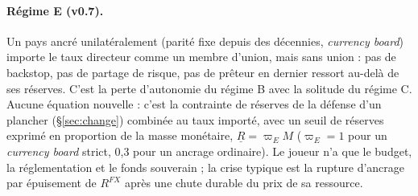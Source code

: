 \documentclass[11pt,a4paper]{article}
\begin{document}
\paragraph{Régime E (v0.7).} Un pays ancré unilatéralement (parité fixe depuis des décennies, \emph{currency board}) importe le taux directeur comme un membre d'union, mais sans union : pas de backstop, pas de partage de risque, pas de prêteur en dernier ressort au-delà de ses réserves. C'est la perte d'autonomie du régime B avec la solitude du régime C. Aucune équation nouvelle : c'est la contrainte de réserves de la défense d'un plancher (\S\ref{sec:change}) combinée au taux importé, avec un seuil de réserves exprimé en proportion de la masse monétaire, $\underline R=\varpi_E M$ ($\varpi_E=1$ pour un \emph{currency board} strict, 0,3 pour un ancrage ordinaire). Le joueur n'a que le budget, la réglementation et le fonds souverain ; la crise typique est la rupture d'ancrage par épuisement de $R^{FX}$ après une chute durable du prix de sa ressource.
\end{document}
